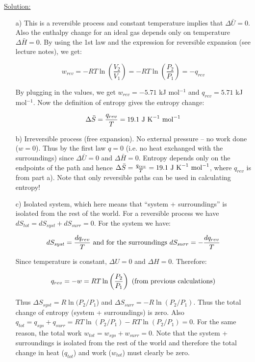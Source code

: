 \noindent
\underline{Solution:}\\

\begin{itemize}

\item[a)] This is a reversible process and constant temperature implies that $\Delta\bar{U} = 0$. Also the enthalpy change for an ideal gas depends only on temperature $\Delta\bar{H} = 0$. By using the 1st law and the expression for reversible expansion (see lecture notes), we get:

$$w_{rev} = -RT\ln\left(\frac{V_2}{V_1}\right) = -RT\ln\left(\frac{P_2}{P_1}\right) = - q_{rev}$$

By plugging in the values, we get $w_{rev} = -5.71$ kJ mol$^{-1}$ and $q_{rev} = 5.71$ kJ mol$^{-1}$. Now the definition of entropy gives the entropy change:

$$\Delta\bar{S} = \frac{q_{rev}}{T} = 19.1\textnormal{ J K}^{-1}\textnormal{ mol}^{-1}$$

\item[b)] Irreversible process (free expansion). No external pressure -- no work done ($w = 0$). Thus by the first law $q = 0$ (i.e. no heat exchanged with the surroundings) since $\Delta\bar{U} = 0$ and $\Delta\bar{H} = 0$. Entropy depends only on the endpoints of the path and hence $\Delta\bar{S} = \frac{q_{rev}}{T} = 19.1\textnormal{ J K}^{-1}\textnormal{ mol}^{-1}$, where $q_{rev}$ is from part a). Note that only reversible paths can be used in calculating entropy!

\item[c)] Isolated system, which here means that ``system + surroundings'' is isolated from the rest of the world. For a reversible process we have $dS_{tot} = dS_{syst} + dS_{surr} = 0$. For the system we have:

$$dS_{syst} = \frac{dq_{rev}}{T}\textnormal{ and for the surroundings }dS_{surr} = -\frac{dq_{rev}}{T}$$

Since temperature is constant, $\Delta U = 0$ and $\Delta H = 0$. Therefore:

$$q_{rev} = -w = RT\ln\left(\frac{P_2}{P_1}\right)\textnormal{ (from previous calculations)}$$

Thus $\Delta S_{syst} = R\ln(P_2/P_1$) and $\Delta S_{surr}  = -R\ln(P_2/P_1)$. Thus the total change of entropy (system + surroundings) is zero. Also $q_{tot} = q_{sys} + q_{surr} = RT\ln(P_2/P_1) - RT\ln(P_2/P_1) = 0$. For the same reason, the total work $w_{tot} = w_{sys} + w_{surr} = 0$. Note that the system + surroundings is isolated from the rest of the world and therefore the total change in heat ($q_{tot}$) and work ($w_{tot}$) must clearly be zero.


\end{itemize}
